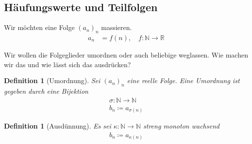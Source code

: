 \documentclass[11pt, twoside, a4paper]{article}
\theoremstyle{plain}
\newtheorem{definition}[blockelement]{Definition}
\newcommand{\definedas}[0]{\coloneqq}
\newcommand{\anf}[1]{\glqq{}#1\grqq}
\newcommand{\fromto}{\rightarrow{}}
\newcommand{\naturalnumbers}{\mathbb{N}}
\newcommand{\realnumbers}{\mathbb{R}}
\begin{document}
    \newpage

    \subsection{Häufungswerte und Teilfolgen}

    Wir möchten eine Folge $(a_n)_n$ \anf{massieren}.
    \begin{align*}
        a_n &= f(n), \quad f: \naturalnumbers \fromto \realnumbers
    \end{align*}

    \noindent Wir wollen die Folgeglieder umordnen oder auch beliebige weglassen. Wie machen wir das und wie lässt sich das ausdrücken?

    \begin{definition}[Umordnung]
        Sei $(a_n)_n$ eine reelle Folge. Eine Umordnung ist gegeben durch eine Bijektion
        \begin{align*}
            \sigma: \naturalnumbers\fromto \naturalnumbers\\
            b_n \definedas a_{\sigma(n)} \tag{Umordnung von $a_n$}
        \end{align*}
    \end{definition}

    \begin{definition}[Ausdünnung]
        Es sei $\kappa: \naturalnumbers\fromto\naturalnumbers$ streng monoton wachsend
        \begin{align*}
            b_n \definedas a_{\kappa(n)}\tag{Teilfolge von $a_n$}
        \end{align*}
    \end{definition}
\end{document}
